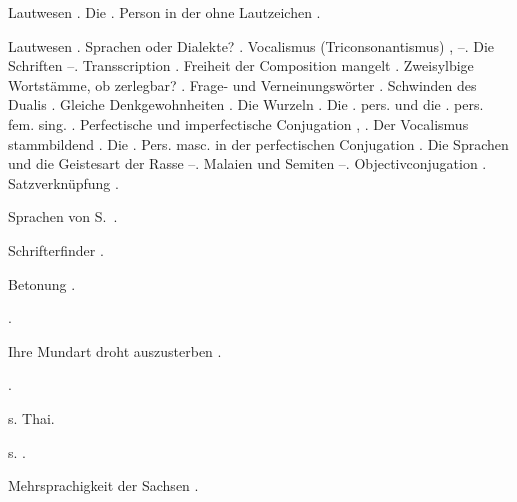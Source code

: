 \begin{register}
 Lautwesen \pageref{sp.34}. Die \pageref{sp.3}. Person in der  ohne Lautzeichen \pageref{sp.393}.

 Lautwesen \pageref{sp.34}. Sprachen oder Dialekte? \pageref{sp.54}. Vocalismus (Triconsonantismus) \pageref{sp.122}, \pageref{sp.148}–\pageref{sp.149}. Die Schriften \pageref{sp.129}–\pageref{sp.130}. Transscription \pageref{sp.134}.  Freiheit der Composition mangelt \pageref{sp.236}. Zweisylbige Wortstämme, ob zerlegbar? \pageref{sp.242}. Frage- und Verneinungswörter \pageref{sp.244}. Schwinden des Dualis \pageref{sp.254}. Gleiche Denkgewohnheiten \pageref{sp.293}. Die Wurzeln \pageref{sp.295}.  Die \pageref{sp.2}. pers.  und die \pageref{sp.3}. pers. fem. sing. \pageref{sp.307}.  Perfectische und imperfectische Conjugation \pageref{sp.372}, \pageref{sp.391}. Der Vocalismus stammbildend \pageref{sp.391}. Die \pageref{sp.3}. Pers. masc. in der perfectischen Conjugation \pageref{sp.392}.  Die Sprachen und die Geistesart der Rasse \pageref{sp.408}–\pageref{sp.411}. Malaien und Semiten \pageref{sp.411}–\pageref{sp.415}. Objectivconjugation \pageref{sp.462}. Satzverknüpfung \pageref{sp.465}.


 Sprachen von S.~\pageref{sp.150}.

 Schrifterfinder \pageref{sp.131}.

 Betonung \pageref{sp.431}.

 \pageref{sp.157}.


 Ihre Mundart droht auszusterben \pageref{sp.146}.

 \pageref{sp.149}.

 s. Thai.

 s. .

 Mehrsprachigkeit der Sachsen \pageref{sp.70}.


\end{register}
